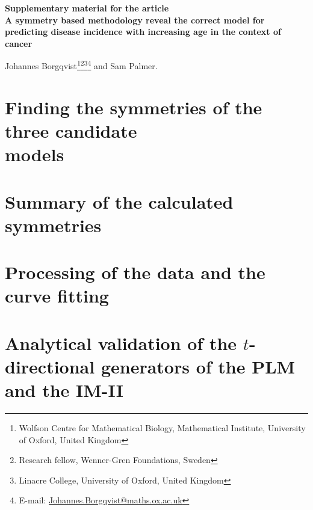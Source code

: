 \documentclass[12pt]{article}
\begin{document}
\begin{titlepage}
  \Large \textbf{Supplementary material for the article}\\[1cm]
  \Huge \textbf{A symmetry based methodology reveal the correct model for predicting disease incidence with increasing age in the context of cancer}\\[1cm]\normalsize

 \vspace{3.0cm}
        \setcounter{footnote}{1}
       Johannes Borgqvist\footnote{\label{Oxford}Wolfson Centre for Mathematical Biology, Mathematical Institute, University of Oxford, United Kingdom}\footnote{\label{WennerGren} Research fellow, Wenner-Gren Foundations, Sweden}\footnote{\label{Linacre} Linacre College, University of Oxford, United Kingdom}\footnote{E-mail: \url{Johannes.Borgqvist@maths.ox.ac.uk}} and Sam Palmer.


  
\end{titlepage}

       \renewcommand*{\thefootnote}{\arabic{footnote}}
        \setcounter{footnote}{0}
\tableofcontents
\listoffigures
\listoftables
\newpage




\section{Finding the symmetries of the three candidate\\models}



\section{Summary of the calculated symmetries}



\section{Processing of the data and the curve fitting}




\section{Analytical validation of the $t$-directional generators of the PLM and the IM-II}
\end{document}
